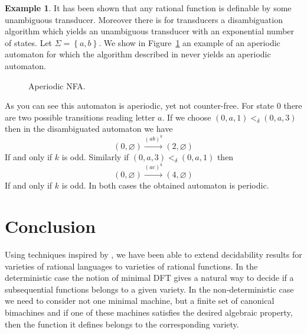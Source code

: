 \documentclass[12pt]{report}
\theoremstyle{definition}
\newtheorem{xmp}{Example}[section]
\theoremstyle{remark}
\begin{document}
\begin{xmp}
It has been shown that any rational function is definable by some unambiguous transducer. Moreover there is for transducers a disambiguation algorithm which yields an unambiguous transducer with an exponential number of states.
Let $\Sigma=\left\{a,b\right\}$.
We show in Figure~\ref{dis} an example of an aperiodic automaton for which the algorithm described in \cite{filiotg12} never yields an aperiodic automaton.

\begin{figure}[t]
\centering

\caption{Aperiodic NFA.}

\label{dis}
\end{figure}

As you can see this automaton is aperiodic, yet not counter-free.
For state $0$ there are two possible transitions reading letter $a$. If we choose $(0,a,1)<_\delta (0,a,3)$ then in the disambiguated automaton we have
$$(0,\varnothing)\xrightarrow{(ab)^{k}}(2,\varnothing)$$
If and only if $k$ is odd. Similarly if $(0,a,3)<_\delta (0,a,1)$ then
$$(0,\varnothing)\xrightarrow{(ac)^{k}}(4,\varnothing)$$
If and only if $k$ is odd. In both cases the obtained automaton is periodic.
\end{xmp}

\chapter*{Conclusion}
Using techniques inspired by \cite{choffrut03,reutenauers91}, we have been able to extend decidability results for varieties of rational languages to varieties of rational functions.
In the deterministic case the notion of minimal DFT gives a natural way to decide if a subsequential functions belongs to a given variety.
In the non-deterministic case we need to consider not one minimal machine, but a finite set of canonical bimachines and if one of these machines satisfies the desired algebraic property, then the function it defines belongs to the corresponding variety.
\end{document}
